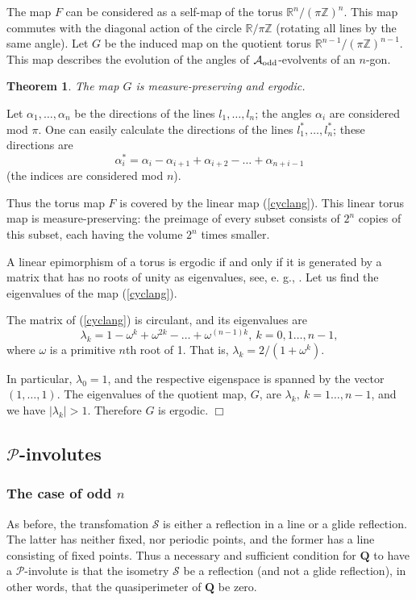 \documentclass[12pt]{article}
\newtheorem{theorem}{Theorem}
\newcommand{\proofend}{$\Box$\bigskip}
\newcommand{\R}{\mathbb {R}}
\newcommand{\Z}{\mathbb{Z}}
\newcommand{\Pev}{\mathcal{P}}
\newcommand{\Aev}{\mathcal{A}}
\begin{document}
The map $F$ can be considered as a self-map of the torus $\R^n/(\pi\Z)^n$. This map commutes with the diagonal action of the circle $\R/\pi\Z$ (rotating all lines by the same angle). Let $G$ be the induced map on the quotient torus $\R^{n-1}/(\pi\Z)^{n-1}$. This map describes the evolution of the angles of $\Aev_{\rm odd}$-evolvents of an $n$-gon.

\begin{theorem} \label{ergodic}
The map $G$ is measure-preserving and ergodic.
\end{theorem}

\proof
Let $\alpha_1,\ldots,\alpha_n$ be the directions of the lines $l_1,\ldots,l_n$; the angles $\alpha_i$ are considered mod $\pi$. One can easily calculate the directions of the lines $l^*_1,\ldots,l^*_n$; these directions are
\begin{equation} \label{cyclang}
\alpha^*_{i}=\alpha_i-\alpha_{i+1}+\alpha_{i+2}-\ldots + \alpha_{n+i-1}
\end{equation}
(the indices are considered mod $n$). 

Thus the torus map $F$ is covered by the linear map (\ref{cyclang}). This linear torus map is measure-preserving: 
the preimage of every subset consists of $2^{n}$ copies of this subset, each having the volume $2^{n}$ times smaller.

A linear epimorphism of a torus is ergodic if and only if it is generated by a matrix that has no roots of unity as eigenvalues, see, e. g., \cite[Corollary 1.10.1]{Wal}. Let us find the eigenvalues of the map (\ref{cyclang}).

The matrix of (\ref{cyclang}) is circulant, and its eigenvalues are 
$$
\lambda_k = 1 - \omega^k + \omega^{2k} - \ldots + \omega^{(n-1)k},\ k=0,1\ldots,n-1,
$$
where $\omega$ is a primitive $n$th root of 1. That is, $\lambda_k = 2/(1+\omega^k)$.

In particular,  $\lambda_0 = 1$, and the respective eigenspace is spanned by the vector $(1,\ldots,1)$. The eigenvalues of the quotient map, $G$, are $\lambda_k,\ k=1\ldots,n-1$, and we have $|\lambda_k| > 1$. Therefore $G$ is ergodic.
\proofend

\subsection{$\Pev$-involutes}\label{P-inv}
\subsubsection{The case of odd $n$} \label{Pinvodd}
As before, the transfomation $\mathcal S$  is either a reflection in a line or a glide reflection. The latter has neither fixed, nor periodic points, and the former has a line consisting of fixed points. Thus a necessary and sufficient condition for $\mathbf Q$ to have a $\Pev$-involute is that the isometry $\mathcal S$ be a reflection (and not a glide reflection), in other words, that the quasiperimeter of $\mathbf Q$ be zero.
\end{document}

